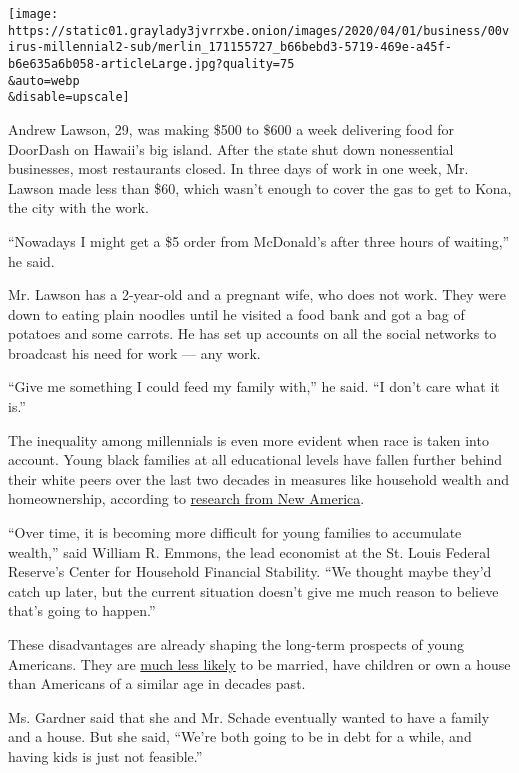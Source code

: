\texttt{[image: https://static01.graylady3jvrrxbe.onion/images/2020/04/01/business/00virus-millennial2-sub/merlin\_171155727\_b66bebd3-5719-469e-a45f-b6e635a6b058-articleLarge.jpg?quality=75\\\&auto=webp\\\&disable=upscale]}

Andrew Lawson, 29, was making \$500 to \$600 a week delivering food for
DoorDash on Hawaii's big island. After the state shut down nonessential
businesses, most restaurants closed. In three days of work in one week,
Mr. Lawson made less than \$60, which wasn't enough to cover the gas to
get to Kona, the city with the work.

``Nowadays I might get a \$5 order from McDonald's after three hours of
waiting,'' he said.

Mr. Lawson has a 2-year-old and a pregnant wife, who does not work. They
were down to eating plain noodles until he visited a food bank and got a
bag of potatoes and some carrots. He has set up accounts on all the
social networks to broadcast his need for work --- any work.

``Give me something I could feed my family with,'' he said. ``I don't
care what it is.''

The inequality among millennials is even more evident when race is taken
into account. Young black families at all educational levels have fallen
further behind their white peers over the last two decades in measures
like household wealth and homeownership, according to
\href{https://www.newamerica.org/millennials/reports/emerging-millennial-wealth-gap/the-millennial-racial-wealth-gap/}{research
from New America}.

``Over time, it is becoming more difficult for young families to
accumulate wealth,'' said William R. Emmons, the lead economist at the
St. Louis Federal Reserve's Center for Household Financial Stability.
``We thought maybe they'd catch up later, but the current situation
doesn't give me much reason to believe that's going to happen.''

These disadvantages are already shaping the long-term prospects of young
Americans. They are
\href{https://www.nytimes3xbfgragh.onion/2019/03/02/style/financial-independence-30s.html}{much
less likely} to be married, have children or own a house than Americans
of a similar age in decades past.

Ms. Gardner said that she and Mr. Schade eventually wanted to have a
family and a house. But she said, ``We're both going to be in debt for a
while, and having kids is just not feasible.''

